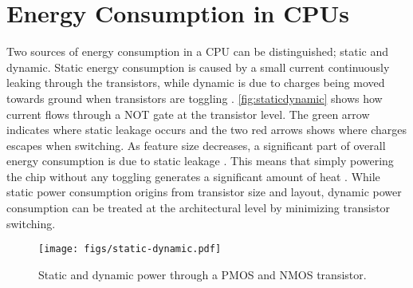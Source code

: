 \section{Energy Consumption in CPUs}

Two sources of energy consumption in a CPU can be distinguished; static and
dynamic. Static energy consumption is caused by a small current continuously
leaking through the transistors, while dynamic is due to charges being moved
towards ground when transistors are toggling \cite{wolf}.
\autoref{fig:staticdynamic} shows how current flows through a NOT gate at the
transistor level. The green arrow indicates where static leakage occurs and the
two red arrows shows where charges escapes when switching. As feature size
decreases, a significant part of overall energy consumption is due to static
leakage \cite{nguyen2003minimization}. This means that simply powering the chip
without any toggling generates a significant amount of heat
\cite{kim2003leakage,martin2002combined}. While static power consumption origins
from transistor size and layout, dynamic power consumption can be treated at the
architectural level by minimizing transistor switching.

\begin{figure}[tbh]
    \centering
    \texttt{[image: figs/static-dynamic.pdf]}
    \caption{Static and dynamic power through a PMOS and NMOS transistor.}
    \label{fig:staticdynamic}
\end{figure}
